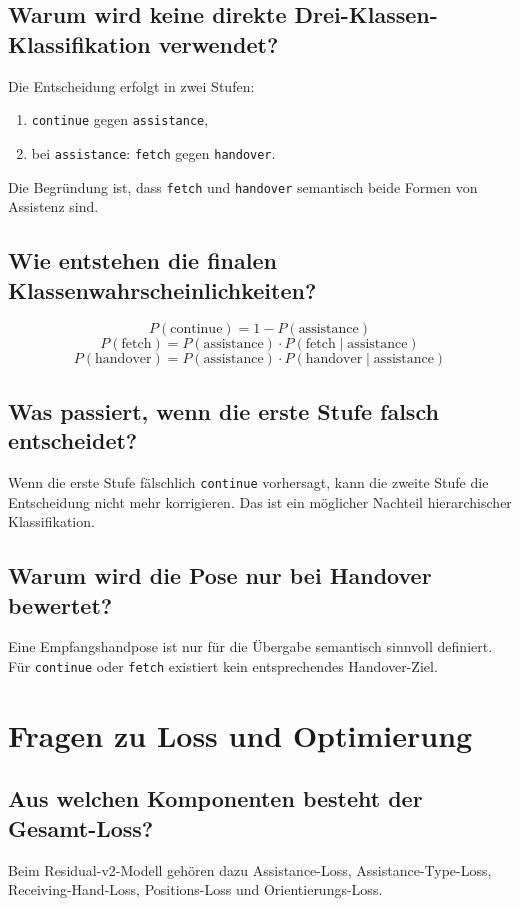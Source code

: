 \documentclass[11pt,a4paper]{article}
\begin{document}
\subsection*{Warum wird keine direkte Drei-Klassen-Klassifikation verwendet?}
Die Entscheidung erfolgt in zwei Stufen:
\begin{enumerate}
    \item \texttt{continue} gegen \texttt{assistance},
    \item bei \texttt{assistance}: \texttt{fetch} gegen \texttt{handover}.
\end{enumerate}
Die Begründung ist, dass \texttt{fetch} und \texttt{handover} semantisch beide Formen von Assistenz sind.

\subsection*{Wie entstehen die finalen Klassenwahrscheinlichkeiten?}
\[
P(\text{continue})=1-P(\text{assistance})
\]
\[
P(\text{fetch})=P(\text{assistance})\cdot P(\text{fetch}\mid\text{assistance})
\]
\[
P(\text{handover})=P(\text{assistance})\cdot P(\text{handover}\mid\text{assistance})
\]

\subsection*{Was passiert, wenn die erste Stufe falsch entscheidet?}
Wenn die erste Stufe fälschlich \texttt{continue} vorhersagt, kann die zweite Stufe die Entscheidung nicht mehr korrigieren. Das ist ein möglicher Nachteil hierarchischer Klassifikation.

\subsection*{Warum wird die Pose nur bei Handover bewertet?}
Eine Empfangshandpose ist nur für die Übergabe semantisch sinnvoll definiert. Für \texttt{continue} oder \texttt{fetch} existiert kein entsprechendes Handover-Ziel.

\section{Fragen zu Loss und Optimierung}

\subsection*{Aus welchen Komponenten besteht der Gesamt-Loss?}
Beim Residual-v2-Modell gehören dazu Assistance-Loss, Assistance-Type-Loss, Receiving-Hand-Loss, Positions-Loss und Orientierungs-Loss.
\end{document}
